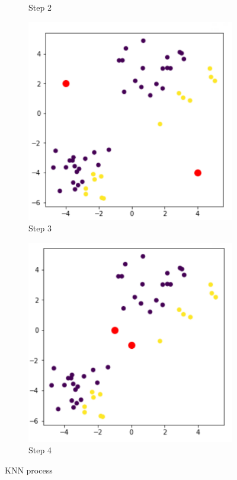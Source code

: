 \documentclass[11pt]{article}
\begin{document}
\begin{figure}[h]
\begin{subfigure}[b]{0.24\textwidth}
        \caption{Step 2}
    \end{subfigure}
    \begin{subfigure}[b]{0.24\textwidth}
        \centering
        \includegraphics[width=\linewidth]{../imgs/knn-proc-3.png}
        \caption{Step 3}
    \end{subfigure}
    \begin{subfigure}[b]{0.24\textwidth}
        \centering
        \includegraphics[width=\linewidth]{../imgs/knn-proc-4.png}
        \caption{Step 4}
    \end{subfigure}
    \caption{KNN process}
\end{figure}
\end{document}
